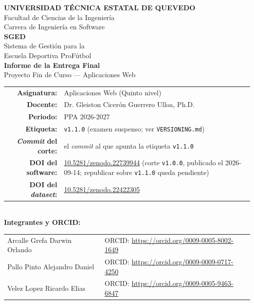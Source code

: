 \documentclass[11pt,a4paper]{article}
\begin{document}
\begin{titlepage}
\centering
\vspace*{1cm}

{\LARGE\bfseries UNIVERSIDAD TÉCNICA ESTATAL DE QUEVEDO}\\[0.3cm]
{\large Facultad de Ciencias de la Ingeniería}\\[0.15cm]
{\large Carrera de Ingeniería en Software}\\[2cm]

{\Huge\bfseries\color{uteqverde} SGED}\\[0.4cm]
{\Large Sistema de Gestión para la\\Escuela Deportiva ProFútbol}\\[1cm]

{\LARGE\bfseries Informe de la Entrega Final}\\[0.4cm]
{\large Proyecto Fin de Curso --- Aplicaciones Web}\\[1.3cm]

\begin{tabular}{rl}
\textbf{Asignatura:} & Aplicaciones Web (Quinto nivel) \\[0.2cm]
\textbf{Docente:} & Dr. Gleiston Cicerón Guerrero Ulloa, Ph.D. \\[0.2cm]
\textbf{Periodo:} & PPA 2026-2027 \\[0.2cm]
\textbf{Etiqueta:} & \texttt{v1.1.0} (examen suspenso; ver \texttt{VERSIONING.md}) \\[0.2cm]
\textbf{\emph{Commit} del corte:} & el \emph{commit} al que apunta la etiqueta \texttt{v1.1.0} \\[0.2cm]
\textbf{DOI del software:} & \href{https://doi.org/10.5281/zenodo.22739944}{10.5281/zenodo.22739944} (corte \texttt{v1.0.0}, publicado el 2026-09-14; republicar sobre \texttt{v1.1.0} queda pendiente) \\[0.2cm]
\textbf{DOI del \emph{dataset}:} & \href{https://doi.org/10.5281/zenodo.22422305}{10.5281/zenodo.22422305} \\
\end{tabular}\\[0.9cm]

{\large\bfseries Integrantes y ORCID:}\\[0.3cm]
\begin{tabular}{ll}
Arcalle Grefa Darwin Orlando & ORCID: \url{https://orcid.org/0009-0005-8002-1649} \\
Pallo Pinto Alejandro Daniel & ORCID: \url{https://orcid.org/0009-0009-0717-4250} \\
Velez Lopez Ricardo Elias & ORCID: \url{https://orcid.org/0009-0005-9463-6847} \\
\end{tabular}\\[0.9cm]


\end{titlepage}
\end{document}
